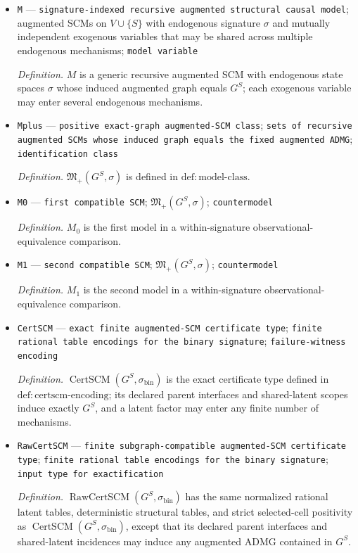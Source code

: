 \documentclass{article}
\begin{document}
\begin{itemize}
  \item \texttt{M} --- \texttt{signature-\allowbreak{}indexed recursive augmented structural causal model}; augmented SCMs on \(V\cup\{S\}\) with endogenous signature \(\sigma\) and mutually independent exogenous variables that may be shared across multiple endogenous mechanisms; \texttt{model variable}
  \par\smallskip\noindent\emph{Definition.} \(M\) is a generic recursive augmented SCM with endogenous state spaces \(\sigma\) whose induced augmented graph equals \(G^S\); each exogenous variable may enter several endogenous mechanisms.
  \item \texttt{Mplus} --- \texttt{positive exact-\allowbreak{}graph augmented-\allowbreak{}SCM class}; \texttt{sets of recursive augmented SCMs whose induced graph equals the fixed augmented ADMG}; \texttt{identification class}
  \par\smallskip\noindent\emph{Definition.} \(\mathfrak M_+(G^S,\sigma)\) is defined in \(\mathrm{def:model\text{-}class}\).
  \item \texttt{M0} --- \texttt{first compatible SCM}; \(\mathfrak M_+(G^S,\sigma)\); \texttt{countermodel}
  \par\smallskip\noindent\emph{Definition.} \(M_0\) is the first model in a within-signature observational-equivalence comparison.
  \item \texttt{M1} --- \texttt{second compatible SCM}; \(\mathfrak M_+(G^S,\sigma)\); \texttt{countermodel}
  \par\smallskip\noindent\emph{Definition.} \(M_1\) is the second model in a within-signature observational-equivalence comparison.
  \item \texttt{CertSCM} --- \texttt{exact finite augmented-\allowbreak{}SCM certificate type}; \texttt{finite rational table encodings for the binary signature}; \texttt{failure-\allowbreak{}witness encoding}
  \par\smallskip\noindent\emph{Definition.} \(\operatorname{CertSCM}(G^S,\sigma_{\mathrm{bin}})\) is the exact certificate type defined in \(\mathrm{def:certscm\text{-}encoding}\); its declared parent interfaces and shared-latent scopes induce exactly \(G^S\), and a latent factor may enter any finite number of mechanisms.
  \item \texttt{RawCertSCM} --- \texttt{finite subgraph-\allowbreak{}compatible augmented-\allowbreak{}SCM certificate type}; \texttt{finite rational table encodings for the binary signature}; \texttt{input type for exactification}
  \par\smallskip\noindent\emph{Definition.} \(\operatorname{RawCertSCM}(G^S,\sigma_{\mathrm{bin}})\) has the same normalized rational latent tables, deterministic structural tables, and strict selected-cell positivity as \(\operatorname{CertSCM}(G^S,\sigma_{\mathrm{bin}})\), except that its declared parent interfaces and shared-latent incidences may induce any augmented ADMG contained in \(G^S\).

\end{itemize}
\end{document}

